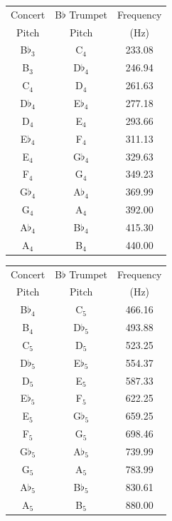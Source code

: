 \documentclass[10pt]{exam}
\begin{document}
\vs


\begin{multicols}{3}
  \footnotesize
  \centering

  \begin{tabular}{ccc}
    Concert & B$\flat$ Trumpet & Frequency \\
    Pitch   &  Pitch & (Hz) \\ 
    \hline\hline
    B$\flat_3$ & C$_4$ & 233.08 \\
    B$_3$ & D$\flat_4$ & 246.94 \\
    C$_4$ & D$_4$ & 261.63 \\
    D$\flat_4$ & E$\flat_4$ & 277.18 \\
    D$_4$ & E$_4$ & 293.66 \\
    E$\flat_4$ & F$_4$ & 311.13 \\
    E$_4$ & G$\flat_4$ & 329.63 \\
    F$_4$ & G$_4$ & 349.23 \\
    G$\flat_4$ & A$\flat_4$ & 369.99 \\
    G$_4$ & A$_4$ & 392.00 \\
    A$\flat_4$ & B$\flat_4$ & 415.30 \\
    A$_4$ & B$_4$ & 440.00 \\
    \hline
  \end{tabular}

  \begin{tabular}{ccc}
    Concert & B$\flat$ Trumpet & Frequency \\
    Pitch   &  Pitch & (Hz) \\ 
    \hline\hline
    B$\flat_4$ & C$_5$ & 466.16 \\
    B$_4$ & D$\flat_5$ & 493.88 \\
    C$_5$ & D$_5$ & 523.25 \\
    D$\flat_5$ & E$\flat_5$ & 554.37 \\
    D$_5$ & E$_5$ & 587.33 \\
    E$\flat_5$ & F$_5$ & 622.25 \\
    E$_5$ & G$\flat_5$ & 659.25 \\
    F$_5$ & G$_5$ & 698.46 \\
    G$\flat_5$ & A$\flat_5$ & 739.99 \\
    G$_5$ & A$_5$ & 783.99 \\
    A$\flat_5$ & B$\flat_5$ & 830.61 \\
    A$_5$ & B$_5$ & 880.00 \\
    \hline
  \end{tabular}


\end{multicols}
\end{document}

